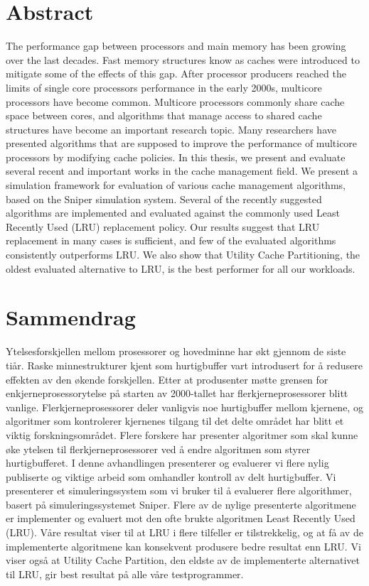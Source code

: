 
\section*{Abstract}

The performance gap between processors and main memory has been growing over the last decades.
Fast memory structures know as caches were introduced to mitigate some of the effects of this gap.
After processor producers reached the limits of single core processors performance in the early 2000s, multicore processors have become common.
Multicore processors commonly share cache space between cores, and algorithms that manage access to shared cache structures have become an important research topic.
Many researchers have presented algorithms that are supposed to improve the performance of multicore processors by modifying cache policies.
In this thesis, we present and evaluate several recent and important works in the cache management field.
We present a simulation framework for evaluation of various cache management algorithms, based on the Sniper simulation system.
Several of the recently suggested algorithms are implemented and evaluated against the commonly used Least Recently Used (LRU) replacement policy.
Our results suggest that LRU replacement in many cases is sufficient, and few of the evaluated algorithms consistently outperforms LRU.
We also show that Utility Cache Partitioning, the oldest evaluated alternative to LRU, is the best performer for all our workloads.

\clearpage

\section*{Sammendrag}
Ytelsesforskjellen mellom prosessorer og hovedminne har økt gjennom de siste tiår.
Raske minnestrukturer kjent som hurtigbuffer vart introdusert for å redusere effekten av den økende forskjellen.
Etter at produsenter møtte grensen for enkjerneprosessorytelse på starten av 2000-tallet har flerkjerneprosessorer blitt vanlige.
Flerkjerneprosessorer deler vanligvis noe hurtigbuffer mellom kjernene, og algoritmer som kontrolerer kjernenes tilgang til det delte området har blitt et viktig forskningsområdet.
Flere forskere har presenter algoritmer som skal kunne øke ytelsen til flerkjerneprosessorer ved å endre algoritmen som styrer hurtigbufferet.
I denne avhandlingen presenterer og evaluerer vi flere nylig publiserte og viktige arbeid som omhandler kontroll av delt hurtigbuffer.
Vi presenterer et simuleringssystem som vi bruker til å evaluerer flere algorithmer, basert på simuleringssystemet Sniper.
Flere av de nylige presenterte algoritmene er implementer og evaluert mot den ofte brukte algoritmen Least Recently Used (LRU).
Våre resultat viser til at LRU i flere tilfeller er tilstrekkelig, og at få av de implementerte algoritmene kan konsekvent produsere bedre resultat enn LRU.
Vi viser også at Utility Cache Partition, den eldste av de implementerte alternativet til LRU, gir best resultat på alle våre testprogrammer.

\clearpage
